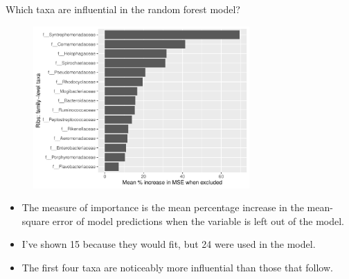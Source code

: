 \documentclass{beamer}
\begin{document}
\begin{frame}{Which taxa are influential in the random forest model?}

  \begin{center}
    \begin{figure}
      \includegraphics[width=3.25in]{use_families/w_ribs/families_rib_PercIncMSE_barchart}
    \end{figure}
  \end{center}
  \vspace{-0.1in}
  {\scriptsize
  \begin{itemize}
  \item The measure of importance is the mean percentage increase in the
    mean-square error of model predictions when the variable is left out of the
    model. 
  \item I've shown 15 because they would fit, but 24 were used in the model.
  \item The first four taxa are noticeably more influential than those that
  follow.
  \end{itemize}
  }

\end{frame}
\end{document}

